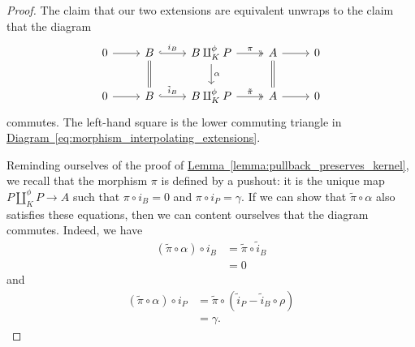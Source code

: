 \documentclass[main.tex]{subfiles}
\begin{document}
\begin{proof}
  The claim that our two extensions are equivalent unwraps to the claim that the diagram
  \begin{equation*}
    \begin{tikzcd}
      0
      \arrow[r]
      & B
      \arrow[r, hook, "i_{B}"]
      \arrow[d, equals]
      & B \amalg_{K}^{\phi}P
      \arrow[r, two heads, "\pi"]
      \arrow[d, "\alpha"]
      & A
      \arrow[r]
      \arrow[d, equals]
      & 0
      \\
      0
      \arrow[r]
      & B
      \arrow[r, hook, "\tilde{i}_{B}"]
      & B \amalg_{K}^{\phi}P
      \arrow[r, two heads, "\tilde{\pi}"]
      & A
      \arrow[r]
      & 0
    \end{tikzcd}
  \end{equation*}
  commutes. The left-hand square is the lower commuting triangle in \hyperref[eq:morphism_interpolating_extensions]{Diagram~\ref*{eq:morphism_interpolating_extensions}}.

  Reminding ourselves of the proof of \hyperref[lemma:pullback_preserves_kernel]{Lemma~\ref*{lemma:pullback_preserves_kernel}}, we recall that the morphism $\pi$ is defined by a pushout: it is the unique map $P \amalg_{K}^{\phi} P \to A$ such that $\pi \circ i_{B} = 0$ and $\pi \circ i_{P} = \gamma$. If we can show that $\tilde{\pi} \circ \alpha$ also satisfies these equations, then we can content ourselves that the diagram commutes. Indeed, we have
  \begin{align*}
    (\tilde{\pi} \circ \alpha) \circ i_{B} &= \tilde{\pi} \circ \tilde{i}_{B} \\
    &= 0
  \end{align*}
  and
  \begin{align*}
    (\tilde{\pi} \circ \alpha) \circ i_{P} &= \tilde{\pi} \circ (\tilde{i}_{P} - \tilde{i}_{B} \circ \rho) \\
    &= \gamma.
  \end{align*}


\end{proof}
\end{document}
